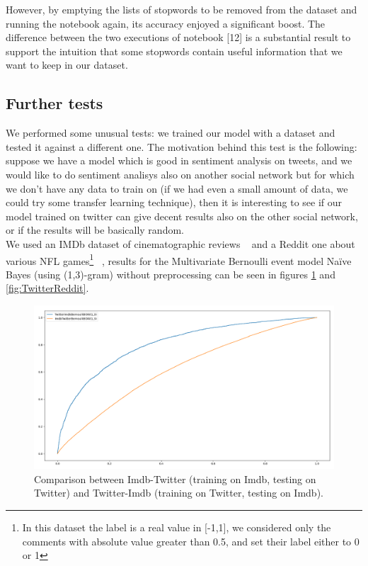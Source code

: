 However,  by emptying the lists of stopwords to be removed from the dataset and running the notebook again,  its accuracy enjoyed a significant boost.  The difference between the two executions of notebook [12] is a substantial result to support the intuition that some stopwords contain useful information that we want to keep in our dataset. 

\subsection*{Further tests}
We performed some unusual tests: we trained our model with a dataset and tested it against a different one. The motivation behind this test is the following: suppose we have a model which is good in sentiment analysis on tweets, and we would like to do sentiment analisys also on another social network but for which we don't have any data to train on (if we had even a small amount of data, we could try some transfer learning technique), then it is interesting to see if our model trained on twitter can give decent results also on the other social network, or if the results will be basically random.\\
We used an IMDb dataset of cinematographic reviews ~\cite{data:imdb} and a Reddit one about various NFL games\footnote{In this dataset the label is a real value in [-1,1], we considered only the comments with absolute value greater than 0.5, and set their label either to 0 or 1} ~\cite{data:reddit}, results for the Multivariate Bernoulli event model Na\"ive Bayes (using (1,3)-gram) without preprocessing can be seen in figures \ref{fig:TwitterImdb} and \ref{fig:TwitterReddit}.

\begin{figure}[h!t]
    \centering
    \includegraphics[scale=0.3]{../experiments/plots/ImdbTwitter}
    \caption{Comparison between Imdb-Twitter (training on Imdb, testing on Twitter) and Twitter-Imdb (training on Twitter, testing on Imdb).}
    \label{fig:TwitterImdb}        
\end{figure}

